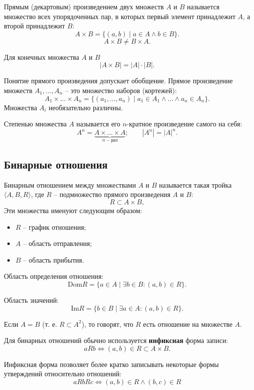 Прямым (декартовым) произведением двух множеств \(A\) и \(B\) называется множество всех упорядоченных пар, в которых первый элемент принадлежит \(A\), а второй принадлежит \(B\):
\[
    A \times B = \{(a, b) \mid a \in A \land b \in B\}.
\]
\[
    A \times B \neq B \times A.
\]

\begin{theorem*}
    Для конечных множества \(A\) и \(B\)
    \[
        |A \times B| = |A| \cdot |B|.
    \]
\end{theorem*}

Понятие прямого произведения допускает обобщение. Прямое произведение множеств \(A_1, \ldots, A_n\) -- это множество наборов (кортежей):
\[
    A_1 \times \ldots \times A_n
    =
    \{(a_1, \ldots, a_n) \mid a_1 \in A_1 \land \ldots \land a_n \in A_n\}.
\]
Множества \(A_i\) необязательно различны.

Степенью множества \(A\) называется его \(n\)-кратное произведение самого на себя:
\[
    A^n = \underbrace{A \times \ldots \times A}_{n-\text{раз}};
    \qquad
    |A^n| = |A|^n.
\]

\subsection{Бинарные отношения}

Бинарным отношением между множествами \(A\) и \(B\) называется такая тройка \(\langle A, B, R \rangle\), где \(R\) -- подмножество прямого произведения \(A\) и \(B\):
\[
    R \subset A \times B,
\]
Эти множества именуют следующим образом:
\begin{itemize}
    \item \(R\) -- график отношения;
    \item \(A\) -- область отправления;
    \item \(B\) -- область прибытия.
\end{itemize}

Область определения отношения:
\[
    \text{Dom} R = \{a \in A \mid \exists b \in B : (a, b) \in R\}.
\]

Область значений:
\[
    \text{Im} R = \{b \in B \mid \exists a \in A : (a, b) \in R\}.
\]

Если \(A = B\) (т. е. \(R \subset A^2\)), то говорят, что \(R\) есть отношение на множестве \(A\).

Для бинарных отношений обычно используется \textbf{инфиксная} форма записи:
\[
    aRb \iff (a, b) \in R \subset A \times B.
\]

Инфиксная форма позволяет более кратко записывать некоторые формы утверждений относительно отношений:
\[
    aRbRc \iff (a, b) \in R \land (b, c) \in R
\]

